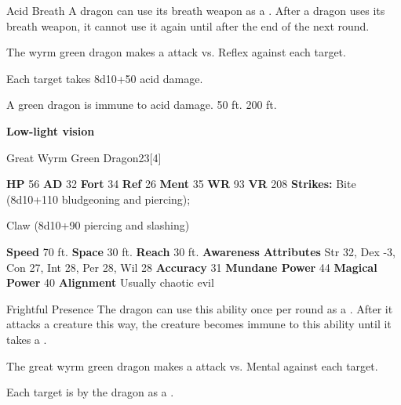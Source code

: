     \begin{freeability}{Acid Breath}
      A dragon can use its breath weapon as a .
      After a dragon uses its breath weapon, it cannot use it again until after the end of the next round.
      \par The wyrm green dragon makes a  attack
        vs. Reflex against each target.
    
    \hit Each target takes 8d10+50 acid damage.
    \end{freeability}
  
      
       A green dragon is immune to acid damage.
     50 ft.
     200 ft.
    \par\noindent\textbf{Low-light vision}
  

  \begin{monsubsection}{Great Wyrm Green Dragon}{23}[4]
    \vspace{-1em}\vspace{-1em}
    \vspace{0em}

    
    

    \begin{spellcontent}
      \begin{spelltargetinginfo}
        \pari \textbf{HP} 56 \monsep
          \textbf{AD} 32 \monsep
          \textbf{Fort} 34 \monsep
          \textbf{Ref} 26 \monsep
          \textbf{Ment} 35
        \pari \textbf{WR} 93 \monsep
        \textbf{VR} 208
        \pari \textbf{Strikes:}
            Bite  (8d10+110 bludgeoning and piercing);
\par Claw  (8d10+90 piercing and slashing)
      \end{spelltargetinginfo}
    \end{spellcontent}
    \begin{monsterfooter}
      \pari \textbf{Speed} 70 ft. \monsep
        \textbf{Space} 30 ft. \monsep
        \textbf{Reach} 30 ft.
      \pari \textbf{Awareness} 
      \pari \textbf{Attributes}
        Str 32, Dex -3,
        Con 27, Int 28,
        Per 28, Wil 28
      \pari \textbf{Accuracy} 31 \monsep
        \textbf{Mundane Power} 44 \monsep
      \textbf{Magical Power} 40
      \pari \textbf{Alignment} Usually chaotic evil
    \end{monsterfooter}
  \end{monsubsection}
  \begin{freeability}{Frightful Presence}
      The dragon can use this ability once per round as a .
      After it attacks a creature this way, the creature becomes immune to this ability until it takes a .
      \par The great wyrm green dragon makes a  attack
        vs. Mental against each target.
    
    \hit Each target is  by the dragon as a .
    \end{freeability}
  

